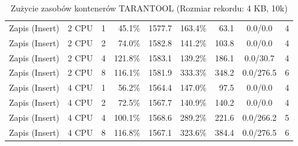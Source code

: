 \begin{table}[ht]
{\begin{tabular}{llcrrrrcc}
Zapis (Insert) & 2 CPU & 1 & 45.1\% & 1577.7 & 163.4\% & 63.1 & 0.0/0.0 & 4 \\
Zapis (Insert) & 2 CPU & 2 & 74.0\% & 1582.8 & 141.2\% & 103.8 & 0.0/0.0 & 4 \\
Zapis (Insert) & 2 CPU & 4 & 121.8\% & 1583.1 & 139.2\% & 186.1 & 0.0/30.7 & 4 \\
Zapis (Insert) & 2 CPU & 8 & 116.1\% & 1581.9 & 333.3\% & 348.2 & 0.0/276.5 & 6 \\
Zapis (Insert) & 4 CPU & 1 & 56.2\% & 1564.4 & 147.0\% & 97.5 & 0.0/0.0 & 4 \\
Zapis (Insert) & 4 CPU & 2 & 72.5\% & 1567.7 & 140.9\% & 140.2 & 0.0/0.0 & 4 \\
Zapis (Insert) & 4 CPU & 4 & 100.1\% & 1568.6 & 289.2\% & 221.6 & 0.0/266.2 & 5 \\
Zapis (Insert) & 4 CPU & 8 & 116.8\% & 1567.1 & 323.6\% & 384.4 & 0.0/276.5 & 6 \\
\bottomrule
\end{tabular}%
}
\caption{Zużycie zasobów kontenerów TARANTOOL (Rozmiar rekordu: 4 KB, 10k)}
\label{tab:resources_tarantool_medium_10000}
\end{table}
